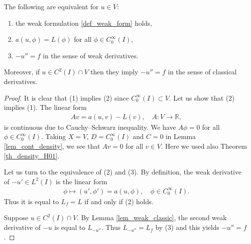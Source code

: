 \documentclass[12pt,oneside]{amsart}
\def\R{\mathbb R}
\begin{document}
\begin{lemma}\label{lem_formulations}
The following are equivalent for $u \in V$:
\begin{enumerate}
\item the weak formulation \eqref{def_weak_form} holds,
\item $a(u, \phi) = L(\phi)$ for all $\phi \in C_0^\infty(I)$,
\item $-u'' = f$ in the sense of weak derivatives.
\end{enumerate}
Moreover, if $u \in C^2(I) \cap V$ then they imply $-u'' = f$ in the sense of classical derivatives. 
\end{lemma}
\begin{proof}
It is clear that (1) implies (2) since $C_0^\infty(I) \subset V$.
Let us show that (2) implies (1).
The linear form 
    \begin{align*}
Av = a(u,v) - L(v), \quad A : V \to \R,
    \end{align*}
is continuous due to Cauchy--Schwarz inequality.
We have $A\phi = 0$ for all $\phi \in C_0^\infty(I)$.
Taking $X = V$, $D = C_0^\infty(I)$ and $C = 0$ in Lemma \ref{lem_cont_density}, we see that $Av = 0$ for all $v \in V$.
Here we used also Theorem \ref{th_density_H01}.

Let us turn to the equivalence of (2) and (3).
By definition, the weak derivative of $-u' \in L^2(I)$ is the linear form 
    \begin{align*}
\phi \mapsto (u', \phi') = a(u, \phi), \quad \phi \in C_0^\infty(I).
    \end{align*} 
Thus it is equal to $L_f = L$ if and only if (2) holds.

Suppose $u \in C^2(I) \cap V$.
By Lemma \ref{lem_weak_classic}, the second weak derivative of $-u$ is equal to $L_{-u''}$.
Thus $L_{-u''} = L_f$ by (3)
and this yields $-u'' = f$.
\end{proof}
\end{document}
